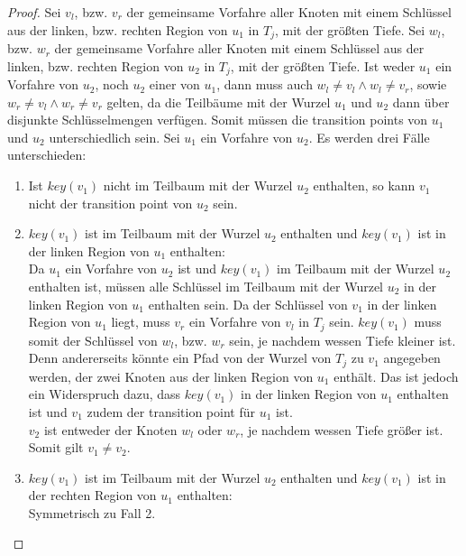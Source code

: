 \documentclass[a4paper,12pt]{article}
\begin{document}
\begin{proof}
	Sei $v_l$, bzw. $v_r$ der gemeinsame Vorfahre aller Knoten mit einem Schlüssel aus der linken, bzw. rechten Region von $u_1$ in $T_j$, mit der größten Tiefe.  Sei $w_l$, bzw. $w_r$ der gemeinsame Vorfahre aller Knoten mit einem Schlüssel aus der linken, bzw. rechten Region von $u_2$ in $T_j$, mit der größten Tiefe. Ist weder $u_1$ ein Vorfahre von $u_2$, noch $u_2$ einer von $u_1$, dann muss auch $w_l \ne v_l \land w_l \ne v_r$, sowie $w_r \ne v_l \land w_r \ne v_r$ gelten, da die Teilbäume mit der Wurzel $u_1$ und $u_2$ dann über disjunkte Schlüsselmengen verfügen. Somit müssen die transition points von $u_1$ und $u_2$ unterschiedlich sein. Sei $u_1$ ein Vorfahre von $u_2$. Es werden drei Fälle unterschieden:
	\begin{enumerate}
		\item Ist $\mathit{key}\left(v_1\right)$ nicht im Teilbaum mit der Wurzel $u_2$ enthalten, so kann $v_1$ nicht der transition point von $u_2$ sein.
		\item $\mathit{key}\left(v_1\right)$ ist im Teilbaum mit der Wurzel $u_2$ enthalten und $\mathit{key}\left(v_1\right)$ ist  in der linken Region von $u_1$ enthalten:\\
		Da $u_1$ ein Vorfahre von $u_2$ ist und  $\mathit{key}\left(v_1\right)$ im Teilbaum mit der Wurzel $u_2$ enthalten ist, müssen alle Schlüssel im Teilbaum mit der Wurzel $u_2$ in der linken Region von $u_1$ enthalten sein. Da der Schlüssel von $v_1$ in der linken Region von $u_1$ liegt, muss $v_r$ ein Vorfahre von $v_l$ in $T_j$ sein. $\mathit{key}\left(v_1\right)$ muss somit der Schlüssel von $w_l$, bzw. $w_r$ sein, je nachdem wessen Tiefe kleiner ist. Denn andererseits könnte ein Pfad von der Wurzel von $T_j$ zu $v_1$ angegeben werden, der zwei Knoten aus der linken Region von $u_1$ enthält. Das ist jedoch ein Widerspruch dazu, dass  $\mathit{key}\left(v_1\right)$ in der linken Region von $u_1$ enthalten ist und $v_1$ zudem der transition point für $u_1$ ist.\\
		$v_2$ ist entweder der Knoten $w_l$ oder $w_r$, je nachdem wessen Tiefe größer ist. Somit gilt $v_1 \ne v_2$.
		\item $\mathit{key}\left(v_1\right)$ ist im Teilbaum mit der Wurzel $u_2$ enthalten und $\mathit{key}\left(v_1\right)$ ist in der rechten Region von $u_1$ enthalten:\\
		Symmetrisch zu Fall 2.
	\end{enumerate}
	
	
	
	
	
	
\end{proof}
\end{document}

